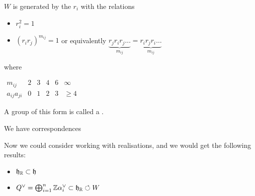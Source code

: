 \documentclass{article}
\begin{document}
\begin{prop}
$W$ is generated by the $r_i$ with the relations 
\begin{itemize}
    \item $r_i^2=1$
    \item $(r_i r_j)^{m_{ij}}=1$ or equivalently $\underbrace{r_j r_i r_j \dots}_{m_{ij}} = \underbrace{r_i r_j r_i \dots}_{m_{ij}}$
\end{itemize}
where 
\begin{center}
    $\begin{array}{c||c|c|c|c|c}
    m_{ij} & 2 & 3 & 4 & 6 & \infty \\ \hline
a_{ij} a_{ji} & 0 & 1 & 2 & 3 & \geq 4
    \end{array}$
\end{center}
\end{prop}

\begin{remark}
	A group of this form is called a .
\end{remark}

\begin{example}
We have correspondences 
\end{example}

Now we could consider working with realisations, and we would get the following results:
\begin{itemize}
    \item $\mathfrak{h}_{\mathbb{R}} \subset \mathfrak{h}$
    \item $Q^\vee = \bigoplus_{i=1}^n \mathbb{Z} \alpha_i^\vee \subset \mathfrak{h}_{\mathbb{R}} \circlearrowleft W$
\end{itemize}
\end{document}
